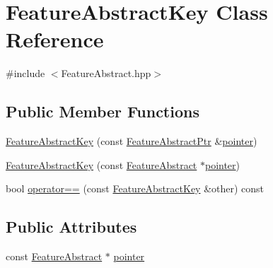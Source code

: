 \hypertarget{class_feature_abstract_key}{\section{Feature\+Abstract\+Key Class Reference}
\label{class_feature_abstract_key}
}


{\ttfamily \#include $<$Feature\+Abstract.\+hpp$>$}

\subsection*{Public Member Functions}
\begin{DoxyCompactItemize}
\item 
\hyperlink{class_feature_abstract_key_a012469a6669ca14dec079b943ccf0f7b}{Feature\+Abstract\+Key} (const \hyperlink{class_feature_abstract_ptr}{Feature\+Abstract\+Ptr} \&\hyperlink{class_feature_abstract_key_a45ece81d4ec1846f38e62318441cb185}{pointer})
\item 
\hyperlink{class_feature_abstract_key_a10cead64ab9d20ea4eb06a5dbdd6fea1}{Feature\+Abstract\+Key} (const \hyperlink{class_feature_abstract}{Feature\+Abstract} $\ast$\hyperlink{class_feature_abstract_key_a45ece81d4ec1846f38e62318441cb185}{pointer})
\item 
bool \hyperlink{class_feature_abstract_key_af2a090e2b5859801c5f28df84b04b90b}{operator==} (const \hyperlink{class_feature_abstract_key}{Feature\+Abstract\+Key} \&other) const 
\end{DoxyCompactItemize}
\subsection*{Public Attributes}
\begin{DoxyCompactItemize}
\item 
const \hyperlink{class_feature_abstract}{Feature\+Abstract} $\ast$ \hyperlink{class_feature_abstract_key_a45ece81d4ec1846f38e62318441cb185}{pointer}
\end{DoxyCompactItemize}


